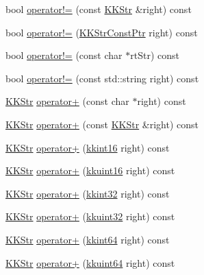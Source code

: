 \begin{DoxyCompactItemize}
\item 
bool \hyperlink{class_k_k_b_1_1_k_k_str_aadfce9b3d52efe8f4e352ab7fc5bb7b3}{operator!=} (const \hyperlink{class_k_k_b_1_1_k_k_str}{K\+K\+Str} \&right) const 
\item 
bool \hyperlink{class_k_k_b_1_1_k_k_str_a6122d9f9979c1d49df6259e155cea0ce}{operator!=} (\hyperlink{class_k_k_b_1_1_k_k_str_af0b636488a4f7497e5f65a576ccb55c8}{K\+K\+Str\+Const\+Ptr} right) const 
\item 
bool \hyperlink{class_k_k_b_1_1_k_k_str_a3840d55ebf6c9a5ddd6f55bb46ad7020}{operator!=} (const char $\ast$rt\+Str) const 
\item 
bool \hyperlink{class_k_k_b_1_1_k_k_str_a3523bee6a465deda0e33359439662c4b}{operator!=} (const std\+::string right) const 
\item 
\hyperlink{class_k_k_b_1_1_k_k_str}{K\+K\+Str} \hyperlink{class_k_k_b_1_1_k_k_str_a107cfd7b6a2074840f8f23e1845495ff}{operator+} (const char $\ast$right) const 
\item 
\hyperlink{class_k_k_b_1_1_k_k_str}{K\+K\+Str} \hyperlink{class_k_k_b_1_1_k_k_str_adc4cc507dc231f5a90b45fd21b2b91a5}{operator+} (const \hyperlink{class_k_k_b_1_1_k_k_str}{K\+K\+Str} \&right) const 
\item 
\hyperlink{class_k_k_b_1_1_k_k_str}{K\+K\+Str} \hyperlink{class_k_k_b_1_1_k_k_str_a741eece5db581bf6c987d62f53157a95}{operator+} (\hyperlink{namespace_k_k_b_a93809780ee294124dda4c23069f41248}{kkint16} right) const 
\item 
\hyperlink{class_k_k_b_1_1_k_k_str}{K\+K\+Str} \hyperlink{class_k_k_b_1_1_k_k_str_a943f84a493f757b4793bc541800266a2}{operator+} (\hyperlink{namespace_k_k_b_aa8c7d4d30381c8a0b6fce68974a9c8a9}{kkuint16} right) const 
\item 
\hyperlink{class_k_k_b_1_1_k_k_str}{K\+K\+Str} \hyperlink{class_k_k_b_1_1_k_k_str_a958411ddaa2a6849f2c553eacfe16089}{operator+} (\hyperlink{namespace_k_k_b_a8fa4952cc84fda1de4bec1fbdd8d5b1b}{kkint32} right) const 
\item 
\hyperlink{class_k_k_b_1_1_k_k_str}{K\+K\+Str} \hyperlink{class_k_k_b_1_1_k_k_str_ae0c5f3538b705f652b9bc2dd6ca0cb23}{operator+} (\hyperlink{namespace_k_k_b_af8d832f05c54994a1cce25bd5743e19a}{kkuint32} right) const 
\item 
\hyperlink{class_k_k_b_1_1_k_k_str}{K\+K\+Str} \hyperlink{class_k_k_b_1_1_k_k_str_a05f683e7848c32d3bd1b6554b3968293}{operator+} (\hyperlink{namespace_k_k_b_aa3486b1c5ea9162b3b020c69f72826eb}{kkint64} right) const 
\item 
\hyperlink{class_k_k_b_1_1_k_k_str}{K\+K\+Str} \hyperlink{class_k_k_b_1_1_k_k_str_a43a7efa72fa73061e027a99b1393b286}{operator+} (\hyperlink{namespace_k_k_b_a1f2b0568d3b63cc7697dcff73250113e}{kkuint64} right) const 

\end{DoxyCompactItemize}
